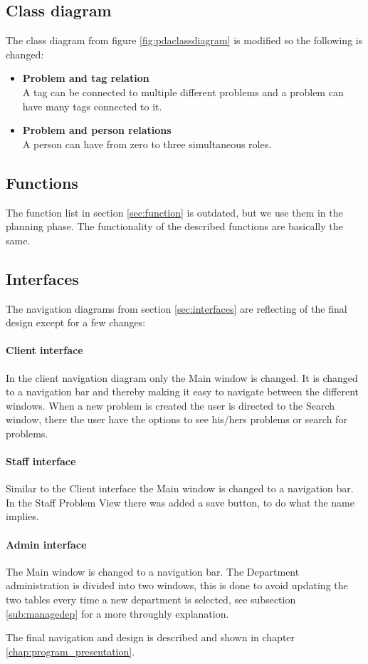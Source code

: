\subsection{Class diagram}
\label{sub:classdiagram}
The class diagram from figure \ref{fig:pdaclassdiagram} is modified so the following is changed:
\begin{itemize}
\item \textbf{Problem and tag relation} \\
					A tag can be connected to multiple different problems and a problem can have many tags connected to it. 
\item \textbf{Problem and person relations} \\
					A person can have from zero to three simultaneous roles.	
\end{itemize}

\subsection{Functions}
\label{sub:function}
The function list in section \ref{sec:function} is outdated, but we use them in the planning phase. The functionality of the described functions are basically the same.  

\subsection{Interfaces}
\label{sub:interface}
The navigation diagrams from section \ref{sec:interfaces} are reflecting of the final design except for a few changes:

\paragraph{Client interface}
In the client navigation diagram only the Main window is changed. It is changed to a navigation bar and thereby making it easy to navigate between the different windows. 
When a new problem is created the user is directed to the Search window, there the user have the options to see his/hers problems or search for problems. 

\paragraph{Staff interface}
Similar to the Client interface the Main window is changed to a navigation bar. In the Staff Problem View there was added a save button, to do what the name implies. 

\paragraph{Admin interface}
The Main window is changed to a navigation bar. The Department administration is divided into two windows, this is done to avoid updating the two tables every time a new department is selected, see subsection \ref{sub:managedep} for a more throughly explanation.  

The final navigation and design is described and shown in chapter \ref{chap:program_presentation}.

